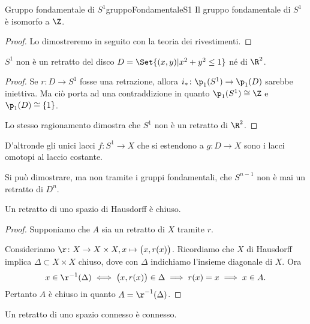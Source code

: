 \begin{teor}{Gruppo fondamentale di \(S^1\)}{gruppoFondamentaleS1}
	Il gruppo fondamentale di \(S^1\) è isomorfo a \(\Z\).
\end{teor}

\begin{proof}
	Lo dimostreremo in seguito con la teoria dei rivestimenti.
\end{proof}

\begin{cor}
	\(S^1\) non è un retratto del disco \(D=\Set{(x,y) | x^2+y^2 \le 1}\) né di \(\R^2\).
\end{cor}

\begin{proof}
	Se \(r\colon D \to S^1\) fosse una retrazione, allora \(i_* \colon \p_1(S^1) \to \p_1(D)\) sarebbe iniettiva.
	Ma ciò porta ad una contraddizione in quanto \(\p_1(S^1) \cong \Z\) e \(\p_1(D) \cong \{1\}\).

	Lo stesso ragionamento dimostra che \(S^1\) non è un retratto di \(\R^2\).
\end{proof}

\begin{oss}
	D'altronde gli unici lacci \(f\colon S^1 \to X\) che si estendono a \(g\colon D \to X\) sono i lacci omotopi al laccio costante.
\end{oss}

\begin{oss}
	Si può dimostrare, ma non tramite i gruppi fondamentali, che \(S^{n-1}\) non è mai un retratto di \(D^n\).
\end{oss}

\begin{pr}
	Un retratto di uno spazio di Hausdorff è chiuso.
\end{pr}

\begin{proof}
	Supponiamo che \(A\) sia un retratto di \(X\) tramite \(r\).

	Consideriamo \(\r \colon X \to X\times X, x \mapsto\big(x,r(x)\big)\).
	Ricordiamo che \(X\) di Hausdorff implica \(\Delta\subset X\times X\) chiuso, dove con \(\Delta\) indichiamo l'insieme diagonale di \(X\).
	Ora
	\[
		x \in \r^{-1}(\Delta) \iff \big(x,r(x)\big) \in \Delta \implies r(x)=x \implies x \in A.
	\]
	Pertanto \(A\) è chiuso in quanto \(A=\r^{-1}(\Delta)\).
\end{proof}

\begin{pr}
	Un retratto di uno spazio connesso è connesso.
\end{pr}

